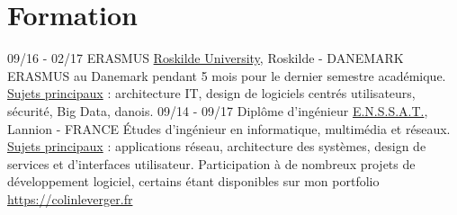 \documentclass[]{friggeri-cv}
\begin{document}
\vspace{-1.1em}


\section{Formation}
\begin{entrylist}
  \entry
    {09/16 - 02/17}
    {ERASMUS}
    {\href{http://www.ruc.dk/en/}{Roskilde University}, Roskilde - DANEMARK}
    {
    ERASMUS au Danemark pendant 5 mois pour le dernier semestre académique.
    \underline {Sujets principaux} : architecture IT, design de logiciels centrés utilisateurs, sécurité, Big Data, danois.
    }
  \entry
    {09/14 - 09/17}
    {Diplôme d'ingénieur}
    {\href{http://www.enssat.fr}{E.N.S.S.A.T.}, Lannion - FRANCE}
    {Études d’ingénieur en informatique, multimédia et réseaux. \underline {Sujets principaux} : applications réseau, architecture des systèmes, design de services et d’interfaces utilisateur. Participation à de nombreux projets de développement logiciel, certains étant disponibles sur mon portfolio \href {https://colinleverger.fr}{https://colinleverger.fr}
}
\vspace{-1.2em}  
\end{entrylist}
\end{document}
